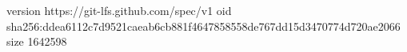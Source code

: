 version https://git-lfs.github.com/spec/v1
oid sha256:ddea6112c7d9521caeab6cb881f4647858558de767dd15d3470774d720ae2066
size 1642598
